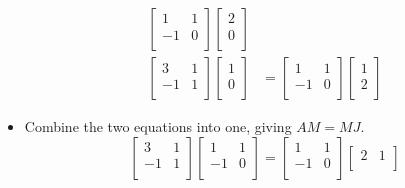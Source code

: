 \documentclass{article}
\begin{document}
\begin{itemize}
\begin{align*}
        \begin{bmatrix}
            1 & 1\\
            -1 & 0\\
        \end{bmatrix}
        \begin{bmatrix}
            2\\
            0\\
        \end{bmatrix}\\
        \begin{bmatrix}
            3 & 1\\
            -1 & 1\\
        \end{bmatrix}
        \begin{bmatrix}
            1\\
            0\\
        \end{bmatrix}
        &=
        \begin{bmatrix}
            1 & 1\\
            -1 & 0\\
        \end{bmatrix}
        \begin{bmatrix}
            1\\
            2\\
        \end{bmatrix}
    \end{align*}
    \item Combine the two equations into one, giving $AM=MJ$.
    \begin{equation*}
        \begin{bmatrix}
            3 & 1\\
            -1 & 1\\
        \end{bmatrix}
        \begin{bmatrix}
            1 & 1\\
            -1 & 0\\
        \end{bmatrix}
        =
        \begin{bmatrix}
            1 & 1\\
            -1 & 0\\
        \end{bmatrix}
        \begin{bmatrix}
            2 & 1\\

\end{bmatrix}
\end{equation*}
\end{itemize}
\end{document}
